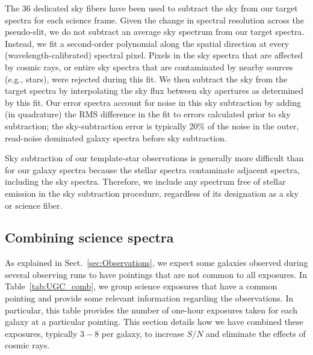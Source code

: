 \documentclass[traditabstract]{aa} %
\begin{document}
The 36 dedicated sky fibers have been used to subtract the sky from our target
spectra for each science frame.  Given the change in spectral resolution across
the pseudo-slit, we do not subtract an average sky spectrum from our target
spectra.  Instead, we fit a second-order polynomial along the spatial direction
at every (wavelength-calibrated) spectral pixel.  Pixels in the sky spectra that
are affected by cosmic rays, or entire sky spectra that are contaminated by
nearby sources (e.g., stars), were rejected during this fit. We then subtract
the sky from the target spectra by interpolating the sky flux between sky
apertures as determined by this fit.  Our error spectra account for noise in
this sky subtraction by adding (in quadrature) the RMS difference in the fit to
errors calculated prior to sky subtraction; the sky-subtraction error is
typically 20\% of the noise in the outer, read-noise dominated galaxy spectra
before sky subtraction.

Sky subtraction of our template-star observations is generally more difficult
than for our galaxy spectra because the stellar spectra contaminate adjacent
spectra, including the sky spectra.  Therefore, we include any spectrum free of
stellar emission in the sky subtraction procedure, regardless of its designation
as a sky or science fiber.


\subsection{Combining science spectra}
\label{sec:Comb}

As explained in Sect.~\ref{sec:Observations}, we expect some galaxies observed
during several observing runs to have pointings that are not common to all
exposures.  In Table~\ref{tab:UGC_comb}, we group science exposures that have a
common pointing and provide some relevant information regarding the
observations.  In particular, this table provides the number of one-hour
exposures taken for each galaxy at a particular pointing.  This section details
how we have combined these exposures, typically $3-8$ per galaxy, to increase
$S/N$ and eliminate the effects of cosmic rays.


\end{document}
